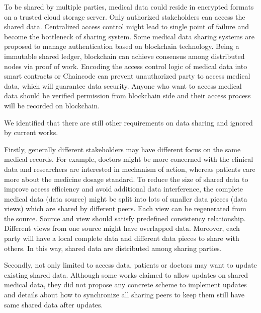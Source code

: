 \documentclass[conference]{IEEEtran}
\begin{document}
To be shared by multiple parties, medical data could reside in encrypted formats on a trusted cloud storage server. Only authorized stakeholders can access the shared data. Centralized access control might lead to single point of failure and become the bottleneck of sharing system. Some medical data sharing systems \cite{azaria2016medrec,fan2018medblock,xia2017bbds} are proposed to manage authentication based on blockchain\cite{nakamoto2008bitcoin} technology. Being a immutable shared ledger, blockchain can achieve consensus among distributed nodes via proof of work. Encoding the access control logic of medical data into smart contracts\cite{azaria2016medrec} or Chaincode \cite{dubovitskaya2017secure} can prevent unauthorized party to access medical data, which will guarantee data security. Anyone who want to access medical data should be verified permission from blockchain side and their access process will be recorded on blockchain.

We identified that there are still other requirements on data sharing and ignored by current works. 

Firstly, generally different stakeholders may have different focus on the same medical records. For example, doctors might be more concerned with the clinical data and researchers are interested in mechanism of action, whereas patients care more about the medicine dosage standard. To reduce the size of shared data to improve access efficiency and avoid additional data interference, the complete medical data (data source) might be split into lots of smaller data pieces (data views) which are shared by different peers. Each view can be regenerated from the source. Source and view should satisfy predefined consistency relationship. Different views from one source might have overlapped data. Moreover, each party will have a local complete data and different data pieces to share with others. In this way, shared data are distributed among sharing parties.

Secondly, not only limited to access data, patients or doctors may want to update existing shared data. Although some works \cite{azaria2016medrec} claimed to allow updates on shared medical data, they did not propose any concrete scheme to implement updates and details about how to synchronize all sharing peers to keep them still have same shared data after updates.
\end{document}
